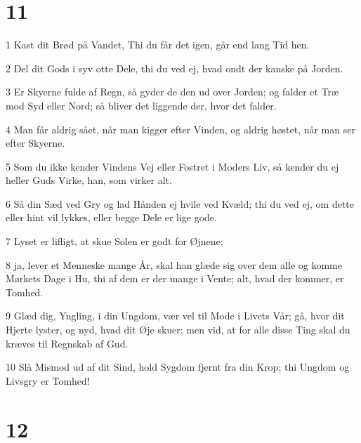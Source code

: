 \chapter{11}

\par 1 Kast dit Brød på Vandet, Thi du får det igen, går end lang Tid hen.
\par 2 Del dit Gods i syv otte Dele, thi du ved ej, hvad ondt der kanske på Jorden.
\par 3 Er Skyerne fulde af Regn, så gyder de den ud over Jorden; og falder et Træ mod Syd eller Nord; så bliver det liggende der, hvor det falder.
\par 4 Man får aldrig sået, når man kigger efter Vinden, og aldrig høstet, når man ser efter Skyerne.
\par 5 Som du ikke kender Vindens Vej eller Fostret i Moders Liv, så kender du ej heller Guds Virke, han, som virker alt.
\par 6 Så din Sæd ved Gry og lad Hånden ej hvile ved Kvæld; thi du ved ej, om dette eller hint vil lykkes, eller begge Dele er lige gode.
\par 7 Lyset er lifligt, at skue Solen er godt for Øjnene;
\par 8 ja, lever et Menneske mange År, skal han glæde sig over dem alle og komme Mørkets Dage i Hu, thi af dem er der mange i Vente; alt, hvad der kommer, er Tomhed.
\par 9 Glæd dig, Yngling, i din Ungdom, vær vel til Mode i Livets Vår; gå, hvor dit Hjerte lyster, og nyd, hvad dit Øje skuer; men vid, at for alle disse Ting skal du kræves til Regnskab af Gud.
\par 10 Slå Mismod ud af dit Sind, hold Sygdom fjernt fra din Krop; thi Ungdom og Livsgry er Tomhed!

\chapter{12}

